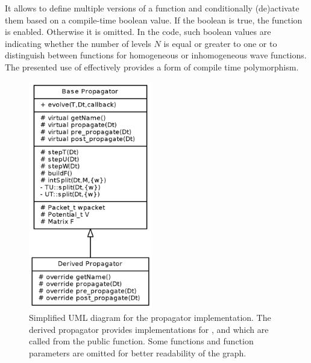 It allows to define multiple versions of a function and conditionally (de)activate them based on a compile-time boolean value.
If the boolean is true, the function is enabled. Otherwise it is omitted.
In the code, such boolean values are indicating whether the number of levels $N$ is equal or greater to one or to distinguish between functions for homogeneous or inhomogeneous wave functions.
The presented use of  effectively provides a form of compile time polymorphism.
%
\begin{figure}[ht]
	\centering
	\includegraphics[height=10cm]{figures/uml.png}
	\caption{Simplified UML diagram for the propagator implementation.
		The derived propagator provides implementations for ,  and  which are called from the public  function.
		Some functions and function parameters are omitted for better readability of the graph.}
	\label{fig:uml}
\end{figure}



